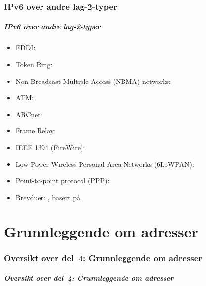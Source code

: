 \section{IPv6 over andre lag-2-typer}
\begin{frame}%
  \frametitle{IPv6 over andre lag-2-typer}
  \pause
  \begin{itemize}[<+->]
  \item FDDI: 
  \item Token Ring: 
  \item Non-Broadcast Multiple Access (NBMA) networks: 
  \item ATM: 
  \item ARCnet: 
  \item Frame Relay: 
  \item IEEE 1394 (FireWire): 
  \item Low-Power Wireless Personal Area Networks (6LoWPAN): 
  \item Point-to-point protocol (PPP): 
  \item Brevduer: , basert på 
  \end{itemize}
\end{frame}

\part{Grunnleggende om adresser}

\begin{frame}
  \partpage
\end{frame}

\section*{Oversikt over del~4: Grunnleggende om adresser}
\begin{frame}[allowframebreaks]
  \frametitle{Oversikt over del~4: Grunnleggende om adresser}
    \tableofcontents%
\end{frame}

